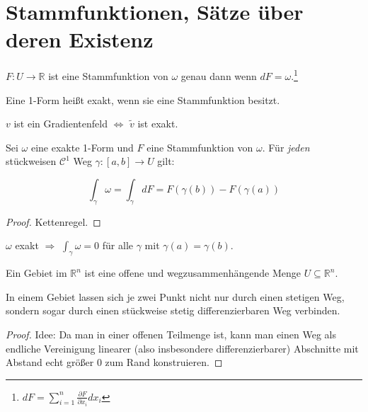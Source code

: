 \section{Stammfunktionen, S\"atze \"uber deren Existenz}
\begin{definition}
	$F:U\rightarrow \mathbb R$ ist eine Stammfunktion von $\omega$ genau dann wenn $dF = \omega$.\footnote{$dF = \sum_{i=1}^n \frac{\partial F}{\partial x_i} dx_i$}
\end{definition}

\begin{definition}[Exaktheit]
	Eine 1-Form hei\ss t exakt, wenn sie eine Stammfunktion besitzt.
\end{definition}

\begin{remark}
	$v$ ist ein Gradientenfeld $\Leftrightarrow$ $\tilde v$ ist exakt.
\end{remark}

\begin{lemma}
	Sei $\omega$ eine exakte 1-Form und $F$ eine Stammfunktion von $\omega$. F\"ur \textit{jeden} st\"uckweisen $\mathcal C^1$ Weg $\gamma: [a,b] \rightarrow U$ gilt:
	
	\begin{equation}\label{eq:integralVonExakten1Formen}
		\int_\gamma \omega = \int_\gamma dF = F(\gamma(b)) - F(\gamma(a))
	\end{equation}
\end{lemma}
\begin{proof}
	Kettenregel.
\end{proof}

\begin{corollary}
	$\omega$ exakt $\Rightarrow$ $\int_\gamma \omega = 0$ f\"ur alle $\gamma$ mit $\gamma(a)=\gamma(b)$.
\end{corollary}

\begin{definition}[Gebiet]
	Ein Gebiet im $\mathbb R^n$ ist eine offene und wegzusammenh\"angende Menge $U \subseteq \mathbb R^n$.
\end{definition}

\begin{lemma}
	In einem Gebiet lassen sich je zwei Punkt nicht nur durch einen stetigen Weg, sondern sogar durch einen st\"uckweise stetig differenzierbaren Weg verbinden.
\end{lemma}
\begin{proof}
	Idee: Da man in einer offenen Teilmenge ist, kann man einen Weg als endliche Vereinigung linearer (also insbesondere differenzierbarer) Abschnitte mit Abstand echt gr\"o\ss er $0$ zum Rand konstruieren.
\end{proof}

